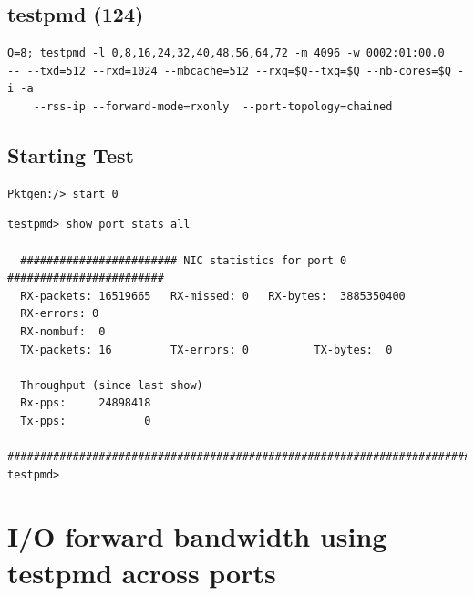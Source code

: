 \documentclass[letter]{article}
\begin{document}
{{\subsection{testpmd (124)}

\begin{lstlisting}[escapechar=!]
Q=8; testpmd -l 0,8,16,24,32,40,48,56,64,72 -m 4096 -w 0002:01:00.0 
-- --txd=512 --rxd=1024 --mbcache=512 --rxq=$Q--txq=$Q --nb-cores=$Q -i -a 
	--rss-ip --forward-mode=rxonly  --port-topology=chained
\end{lstlisting}

\subsection{Starting Test}

\begin{lstlisting}[escapechar=!]
Pktgen:/> start 0
\end{lstlisting}

\begin{lstlisting}
testpmd> show port stats all

  ######################## NIC statistics for port 0  ########################
  RX-packets: 16519665   RX-missed: 0   RX-bytes:  3885350400
  RX-errors: 0
  RX-nombuf:  0         
  TX-packets: 16         TX-errors: 0          TX-bytes:  0

  Throughput (since last show)
  Rx-pps:     24898418
  Tx-pps:            0
  ############################################################################
testpmd> 
\end{lstlisting}




\section{I/O forward bandwidth using testpmd across ports}

}}
\end{document}
